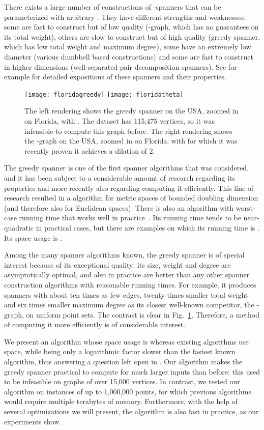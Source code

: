 \documentclass[runningheads,envcountsame,oribibl,orivec]{llncs}
\begin{document}
There exists a large number of constructions of -spanners that can be parameterized with arbitrary . They have different strengths and weaknesses: some are fast to construct but of low quality (-graph, which has no guarantees on its total weight), others are slow to construct but of high quality (greedy spanner, which has low total weight and maximum degree), some have an extremely low diameter (various dumbbell based constructions) and some are fast to construct in higher dimensions (well-separated pair decomposition spanners). See for example \cite{Narasimhan:2007:GSN:1208237} for detailed expositions of these spanners and their properties.

\begin{figure}[t]\centering
\texttt{[image: floridagreedy]}
\texttt{[image: floridatheta]}
\caption{The left rendering shows the greedy spanner on the USA, zoomed in on Florida, with . The dataset has 115,475 vertices, so it was infeasible to compute this graph before. The right rendering shows the -graph on the USA, zoomed in on Florida, with  for which it was recently proven it achieves a dilation of 2.}
\label{figure:greedy}
\end{figure}

The greedy spanner is one of the first spanner algorithms that was considered, and it has been subject to a considerable amount of research regarding its properties and more recently also regarding computing it efficiently. This line of research resulted in a  algorithm \cite{BoseCFMS2010} for metric spaces of bounded doubling dimension (and therefore also for Euclidean spaces). There is also an algorithm with  worst-case running time that works well in practice~\cite{FarshiG09}. Its running time tends to be near-quadratic in practical cases, but there are examples on which its running time is . Its space usage is .

Among the many spanner algorithms known, the greedy spanner is of special interest because of its exceptional quality: its size, weight and degree are asymptotically optimal, and also in practice are better than any other spanner construction algorithms with reasonable running times. For example, it produces spanners with about ten times as few edges, twenty times smaller total weight and six times smaller maximum degree as its closest well-known competitor, the -graph, on uniform point sets. The contrast is clear in Fig.~\ref{figure:greedy}. Therefore, a method of computing it more efficiently is of considerable interest.

We present an algorithm whose space usage is  whereas existing algorithms use  space, while being only a logarithmic factor slower than the fastest known algorithm, thus answering a question left open in \cite{BoseCFMS2010}.
Our algorithm makes the greedy spanner practical to compute for much larger inputs than before: this used to be infeasible on graphs of over 15,000 vertices. In contrast, we tested our algorithm on instances of up to 1,000,000 points, for which previous algorithms would require multiple terabytes of memory. Furthermore, with the help of several optimizations we will present, the algorithm is also fast in practice, as our experiments show.
\end{document}
